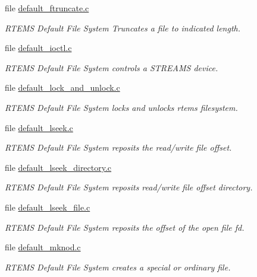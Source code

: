 \begin{DoxyCompactItemize}
file \mbox{\hyperlink{default__ftruncate_8c}{default\+\_\+ftruncate.\+c}}
\begin{DoxyCompactList}\small\item\em R\+T\+E\+MS Default File System Truncates a file to indicated length. \end{DoxyCompactList}\item 
file \mbox{\hyperlink{default__ioctl_8c}{default\+\_\+ioctl.\+c}}
\begin{DoxyCompactList}\small\item\em R\+T\+E\+MS Default File System controls a S\+T\+R\+E\+A\+MS device. \end{DoxyCompactList}\item 
file \mbox{\hyperlink{default__lock__and__unlock_8c}{default\+\_\+lock\+\_\+and\+\_\+unlock.\+c}}
\begin{DoxyCompactList}\small\item\em R\+T\+E\+MS Default File System locks and unlocks rtems filesystem. \end{DoxyCompactList}\item 
file \mbox{\hyperlink{default__lseek_8c}{default\+\_\+lseek.\+c}}
\begin{DoxyCompactList}\small\item\em R\+T\+E\+MS Default File System reposits the read/write file offset. \end{DoxyCompactList}\item 
file \mbox{\hyperlink{default__lseek__directory_8c}{default\+\_\+lseek\+\_\+directory.\+c}}
\begin{DoxyCompactList}\small\item\em R\+T\+E\+MS Default File System reposits read/write file offset directory. \end{DoxyCompactList}\item 
file \mbox{\hyperlink{default__lseek__file_8c}{default\+\_\+lseek\+\_\+file.\+c}}
\begin{DoxyCompactList}\small\item\em R\+T\+E\+MS Default File System reposits the offset of the open file fd. \end{DoxyCompactList}\item 
file \mbox{\hyperlink{default__mknod_8c}{default\+\_\+mknod.\+c}}
\begin{DoxyCompactList}\small\item\em R\+T\+E\+MS Default File System creates a special or ordinary file. \end{DoxyCompactList}\item 

\end{DoxyCompactItemize}
